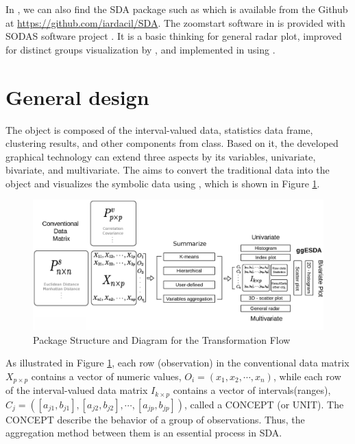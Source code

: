 \documentclass[article]{jss}
\begin{document}
In , we can also find the SDA package such as  \cite{umbleja:2020} which is available from the Github at \url{https://github.com/iardacil/SDA}. The zoomstart software in  is provided with SODAS software project \cite{diday:2008}. It is a basic thinking for general radar plot, improved for distinct groups visualization by , and implemented in  using .


 
\section{General design}

The  object is composed of the interval-valued data, statistics data frame, clustering results, and other components from  class. Based on it, the developed graphical technology can extend three aspects by its variables, univariate, bivariate, and multivariate. The  aims to convert the traditional data into the  object and visualizes the symbolic data using , which is shown in Figure \ref{fig:pkgStr}.

\begin{figure}[h]	
  		\centering	 			 	
 	 		\includegraphics[width=1\textwidth]{doc/packageStructure2.eps} 
  		\caption{Package Structure and Diagram for the Transformation Flow} 
  		\label{fig:pkgStr}   			 		 
\end{figure}

As illustrated in Figure \ref{fig:pkgStr}, each row (observation) in the conventional data matrix $X_{p \times p}$ contains a vector of numeric values, $O_i = (x_1,x_2,\cdots,x_n)$, while each row of the interval-valued data matrix $I_{k \times p}$ contains a vector of intervals(ranges), $C_j = ([a_{j1},b_{j1}],[a_{j2},b_{j2}],\cdots,[a_{jp},b_{jp}])$, called a CONCEPT (or UNIT). The CONCEPT describe the behavior of a group of observations. Thus, the aggregation method between them is an essential process in SDA.
\end{document}
